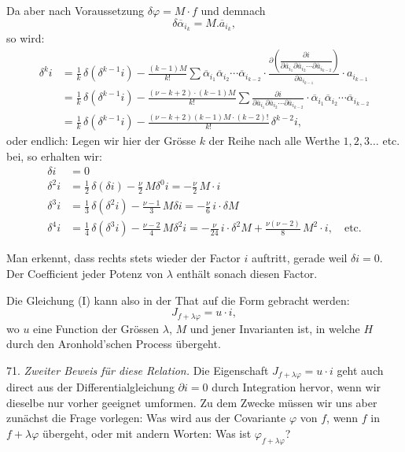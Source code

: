 Da aber nach Voraussetzung $\delta\varphi = M\cdot f$ und demnach
\[
\delta\overline\alpha_{i_k} = M.\overline a_{i_k},
\]
so wird:
\[
\begin{aligned}
\delta^k i &= \frac{1}{k}\,\delta(\delta^{k-1}i) - \frac{(k-1)M}{k!}\sum \overline\alpha_{i_1}\overline\alpha_{i_2}\cdots\overline\alpha_{i_{k-2}}\cdot \frac{\partial\left(\dfrac{\partial i}{\partial\overline a_{i_1}\partial\overline a_{i_2}\cdots\partial\overline a_{i_{k-2}}}\right)}{\partial\overline a_{i_{k-1}}}\cdot a_{i_{k-1}}\\
&= \frac{1}{k}\,\delta(\delta^{k-1}i) - \frac{(\nu-k+2)\cdot(k-1)M}{k!}\sum \frac{\partial i}{\partial\overline a_{i_1}\partial\overline a_{i_2}\cdots\partial\overline a_{i_{k-2}}}\cdot \overline\alpha_{i_1}\overline\alpha_{i_2}\cdots\overline\alpha_{i_{k-2}}\\
&= \frac{1}{k}\,\delta(\delta^{k-1}i) - \frac{(\nu-k+2)(k-1)M\cdot(k-2)!}{k!}\,\delta^{k-2}i,
\end{aligned}
\]
oder endlich:
Legen wir hier der Grösse $k$ der Reihe nach alle Werthe $1, 2, 3\dots$ etc. bei, so erhalten wir:
\[
\begin{aligned}
\delta i &= 0\\
\delta^2 i &= \frac{1}{2}\,\delta(\delta i) - \frac{\nu}{2}\,M\delta^0 i = -\frac{\nu}{2}\,M\cdot i\\
\delta^3 i &= \frac{1}{3}\,\delta(\delta^2 i) - \frac{\nu-1}{3}\,M\delta i = -\frac{\nu}{6}\,i\cdot \delta M\\
\delta^4 i &= \frac{1}{4}\,\delta(\delta^3 i) - \frac{\nu-2}{4}\,M\delta^2 i = -\frac{\nu}{24}\,i\cdot \delta^2 M + \frac{\nu(\nu-2)}{8}\,M^2\cdot i, \quad \text{etc.}
\end{aligned}
\]

Man erkennt, dass rechts stets wieder der Factor $i$ auftritt, gerade weil $\delta i=0$. Der Coefficient jeder Potenz von $\lambda$ enthält sonach diesen Factor.


Die Gleichung (I) kann also in der That auf die Form gebracht werden:
\[
J_{f+\lambda\varphi} = u\cdot i,
\]
wo $u$ eine Function der Grössen $\lambda$, $M$ und jener Invarianten ist, in welche $H$ durch den Aronhold'schen Process übergeht.

71. \textit{Zweiter Beweis für diese Relation.} Die Eigenschaft $J_{f+\lambda\varphi}=u\cdot i$ geht auch direct aus der Differentialgleichung $\partial i=0$ durch Integration hervor, wenn wir dieselbe nur vorher geeignet umformen. Zu dem Zwecke müssen wir uns aber zunächst die Frage vorlegen: Was wird aus der Covariante $\varphi$ von $f$, wenn $f$ in $f+\lambda\varphi$ übergeht, oder mit andern Worten: Was ist $\varphi_{f+\lambda\varphi}$?

